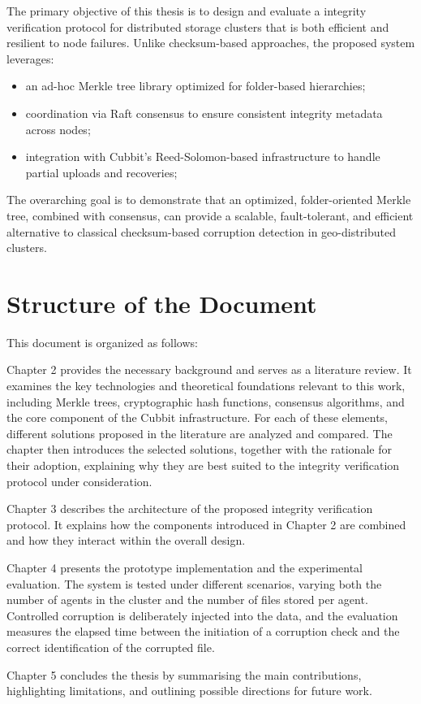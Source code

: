The primary objective of this thesis is to design and evaluate a integrity verification protocol for distributed storage clusters that is both efficient and resilient to node failures. Unlike checksum-based approaches, the proposed system leverages:  
\begin{itemize}
    \item an ad-hoc Merkle tree library optimized for folder-based hierarchies;  
    \item coordination via Raft consensus to ensure consistent integrity metadata across nodes;  
    \item integration with Cubbit's Reed-Solomon-based infrastructure to handle partial uploads and recoveries;  
\end{itemize}

The overarching goal is to demonstrate that an optimized, folder-oriented Merkle tree, combined with consensus, can provide a scalable, fault-tolerant, and efficient alternative to classical checksum-based corruption detection in geo-distributed clusters.


\section{Structure of the Document}

This document is organized as follows:

Chapter 2 provides the necessary background and serves as a literature review. It examines the key technologies and theoretical foundations relevant to this work, including Merkle trees, cryptographic hash functions, consensus algorithms, and the core component of the Cubbit infrastructure. For each of these elements, different solutions proposed in the literature are analyzed and compared. The chapter then introduces the selected solutions, together with the rationale for their adoption, explaining why they are best suited to the integrity verification protocol under consideration.
    
Chapter 3 describes the architecture of the proposed integrity verification protocol. It explains how the components introduced in Chapter 2 are combined and how they interact within the overall design.

Chapter 4 presents the prototype implementation and the experimental evaluation. The system is tested under different scenarios, varying both the number of agents in the cluster and the number of files stored per agent. Controlled corruption is deliberately injected into the data, and the evaluation measures the elapsed time between the initiation of a corruption check and the correct identification of the corrupted file.

Chapter 5 concludes the thesis by summarising the main contributions, highlighting limitations, and outlining possible directions for future work.
